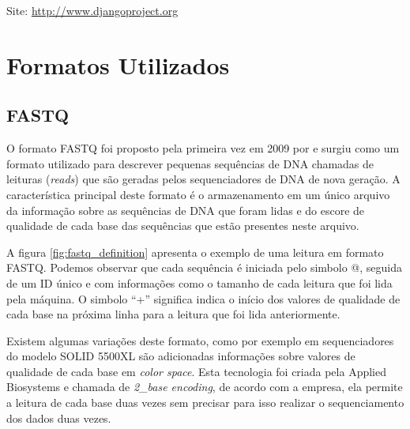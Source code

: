 \noindent
Site: \url{http://www.djangoproject.org}

\section{Formatos Utilizados}

\subsection{FASTQ}

O formato FASTQ foi proposto pela primeira vez em 2009 por \cite{Cock2009} e surgiu como um formato utilizado para descrever pequenas sequências de DNA chamadas de leituras (\textit{reads}) que são geradas pelos sequenciadores de DNA de nova geração. A característica principal deste formato é o armazenamento em um único arquivo da informação sobre as sequências de DNA que foram lidas e do escore de qualidade de cada base das sequências que estão presentes neste arquivo. 

A figura \ref{fig:fastq_definition} apresenta o exemplo de uma leitura em formato FASTQ. Podemos observar que cada sequência é iniciada pelo simbolo @, seguida de um ID único e com informações como o tamanho de cada leitura que foi lida pela máquina.
O simbolo ``+'' significa indica o início dos valores de qualidade de cada base na próxima linha para a leitura que foi lida anteriormente.

Existem algumas variações deste formato, como por exemplo em sequenciadores do modelo SOLID 5500XL são adicionadas informações sobre valores de qualidade de cada base em \textit{color space}. Esta tecnologia foi criada pela Applied Biosystems e chamada de \textit{2\_base encoding}, de acordo com a empresa, ela permite a leitura de cada base duas vezes sem precisar para isso realizar o sequenciamento dos dados duas vezes.



